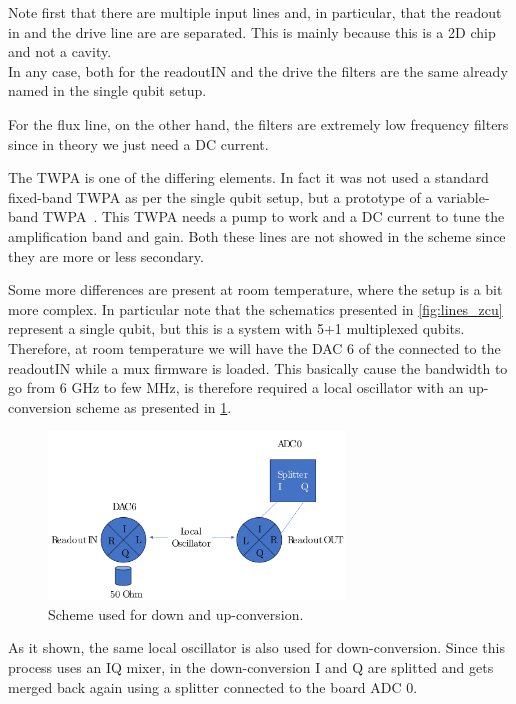 Note first that there are multiple input lines and, in particular, that the readout in and the drive line are are separated.
This is mainly because this is a 2D chip and not a cavity.\\
In any case, both for the readoutIN and the drive the filters are the same already named in the single qubit setup.

For the flux line, on the other hand, the filters are extremely low frequency filters since in theory we just need a DC current.

The TWPA is one of the differing elements. In fact it was not used a standard fixed-band TWPA as per the single qubit setup, but a prototype of a variable-band TWPA~\cite{Ranadive2022}.
This TWPA needs a pump to work and a DC current to tune the amplification band and gain. Both these lines are not showed in the scheme since they are more or less secondary.

Some more differences are present at room temperature, where the setup is a bit more complex.
In particular note that the schematics presented in \cref{fig:lines_zcu} represent a single qubit, but this is a system with 5+1 multiplexed qubits.
Therefore, at room temperature we will have the DAC 6 of the \ZCU connected to the readoutIN while a mux firmware is loaded.
This basically cause the bandwidth to go from $6$ GHz to few MHz, is therefore required a local oscillator with an up-conversion scheme as presented in \cref{fig:up-down-conversion}. 
\begin{figure}[ht]
    \centering
    \includegraphics[width=0.7\textwidth]{Setup-software/figures/upconversion.pdf}
    \caption{Scheme used for down and up-conversion.}
    \label{fig:up-down-conversion}
\end{figure}
As it shown, the same local oscillator is also used for down-conversion.
Since this process uses an IQ mixer, in the down-conversion I and Q are splitted and gets merged back again using a splitter connected to the board ADC 0.


